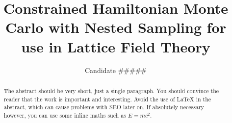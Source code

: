 \documentclass[aps,prd,reprint,preprintnumbers,showpacs,floatfix,nofootinbib,superscript address]{revtex4-2}
\begin{document}
\title{Constrained Hamiltonian Monte Carlo with Nested Sampling for use in Lattice Field Theory}

\author{Candidate \#\#\#\#\#}

\begin{abstract}
	The abstract should be very short, just a single paragraph. You should convince the reader that the work is important and interesting. Avoid the use of \LaTeX{} in the abstract, which can cause problems with SEO later on. If absolutely necessary however, you can use some inline maths such as $E=mc^2$.
\end{abstract}


\maketitle



















\end{document}
